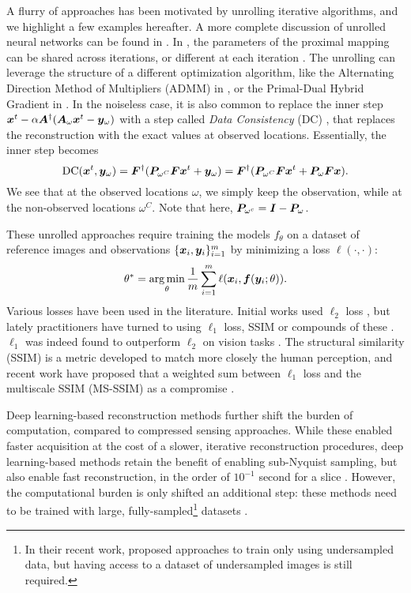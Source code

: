 A flurry of approaches has been motivated by unrolling iterative algorithms, and we highlight a few examples hereafter. A more complete discussion of unrolled neural networks can be found in \citet{liang2020deep}. In \citet{mardani2018neural}, the parameters of the proximal mapping can be shared across iterations, or different at each iteration \citep{schlemper2017deep}. The unrolling can leverage the structure of a different optimization algorithm, like the Alternating Direction Method of Multipliers (ADMM) in \citet{sun2016deep}, or the Primal-Dual Hybrid Gradient in \citet{adler2018learned}. In the noiseless case, it is also common to replace the inner step ${\bm{x}}^t-\alpha {\bm{A}}^\dagger({\bm{A}}_\omega {\bm{x}}^t-{\bm{y}}_\omega)$ with a step called \textit{Data Consistency} (DC) \citep{schlemper2017deep,zhang2019reducing}, that replaces the reconstruction with the exact values at observed locations. Essentially, the inner step becomes
\begin{equation}
    \text{DC}({\bm{x}}^t,{\bm{y}}_\omega)={\bm{F}}^\dagger ({\bm{P}}_{\omega^C}{\bm{F}} {\bm{x}}^t + {\bm{y}}_\omega) = {\bm{F}}^\dagger ({\bm{P}}_{\omega^C}{\bm{F}} {\bm{x}}^t + {\bm{P}}_{\omega}{\bm{F}}{\bm{x}}).\label{eq:DC}
\end{equation}
We see that at the observed locations $\omega$, we simply keep the observation, while at the non-observed locations $\omega^C$. Note that here, ${\bm{P}}_{\omega^c}={\bm{I}}-{\bm{P}}_\omega$.

These unrolled approaches require training the models $f_\theta$ on a dataset of reference images and observations $\{{\bm{x}}_i,{\bm{y}}_i\}_{i=1}^{m}$ by minimizing a loss $\ell(\cdot,\cdot)$:
\begin{equation}
    \theta^* = \operatorname*{arg\,min}_\theta \frac{1}{m}\sum_{i=1}^m \ell({\bm{x}}_i,{\bm{f}}({\bm{y}}_i;\theta)).
\end{equation}
Various losses have been used in the literature. Initial works used $\ell_2$ loss \citep{schlemper2017deep,hammernik2018learning}, but lately practitioners have turned to using $\ell_1$ loss, SSIM or compounds of these \citet{muckleyStateoftheArtMachineLearning2020}. $\ell_1$ was indeed found to outperform $\ell_2$ on vision tasks \citet{zhao2016loss}. The structural similarity (SSIM) \citep{wang2004image} is a metric developed to match more closely the human perception, and recent work have proposed that a weighted sum between $\ell_1$ loss and the multiscale SSIM (MS-SSIM) as a compromise \citep{zhao2016loss}.


Deep learning-based reconstruction methods further shift the burden of computation, compared to compressed sensing approaches. While these enabled faster acquisition at the cost of a slower, iterative reconstruction procedures, deep learning-based methods retain the benefit of enabling sub-Nyquist sampling, but also enable fast reconstruction, in the order of $10^{-1}$ second for a slice \citep{jin2017deep,hammernik2018learning}. However, the computational burden is only shifted an additional step: these methods need to be trained with large, fully-sampled\footnote{In their recent work, \citet{yaman2020self} proposed approaches to train only using undersampled data, but having access to a dataset of undersampled images is still required.} datasets \citep{zbontarFastMRIOpenDataset2019}. 

